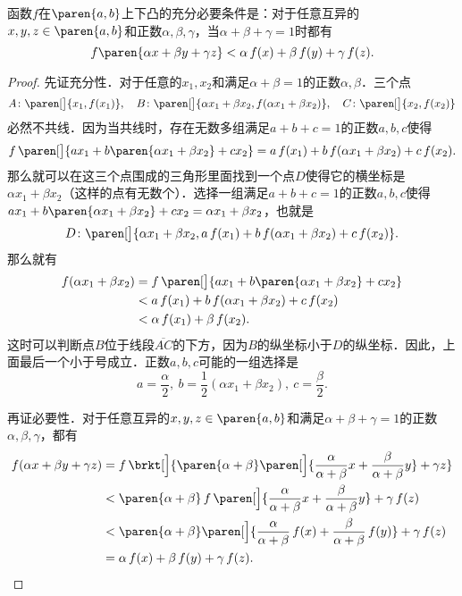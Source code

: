 \begin{example*}
  函数\(f\)在\(\paren{a,b}\)上下凸的充分必要条件是：对于任意互异的\(x, y, z \in \paren{a,b}\)和正数\(\alpha, \beta, \gamma\)，当\(\alpha+\beta+\gamma=1\)时都有
  \[
    f\paren{\alpha x + \beta y + \gamma z} < \alpha\,f(x) + \beta\,f(y) + \gamma\,f(z).
  \]

  \begin{proof}
    先证充分性．对于任意的\(x_1, x_2\)和满足\(\alpha+\beta=1\)的正数\(\alpha, \beta\)．三个点
    \[
      A\colon \paren[\big]{x_1, f(x_1)},\quad B\colon \paren[\big]{\alpha x_1 + \beta x_2, f(\alpha x_1 + \beta x_2)},\quad C\colon \paren[\big]{x_2, f(x_2)}
    \]
    必然不共线．因为当共线时，存在无数多组满足\(a+b+c=1\)的正数\(a, b, c\)使得
    \[
      f\,\paren[\big]{a x_1 + b\paren{\alpha x_1 + \beta x_2}  + c x_2} = a\,f(x_1) + b\,f(\alpha x_1 + \beta x_2) + c\,f(x_2).
    \]
    那么就可以在这三个点围成的三角形里面找到一个点\(D\)使得它的横坐标是\(\alpha x_1 + \beta x_2\)（这样的点有无数个）．选择一组满足\(a+b+c=1\)的正数\(a, b, c\)使得\(a x_1 + b\paren{\alpha x_1 + \beta x_2}  + c x_2 = \alpha x_1 + \beta x_2 \)，也就是
    \[
      D\colon \paren[\big]{\alpha x_1 + \beta x_2, a\,f(x_1) + b\,f(\alpha x_1 + \beta x_2) + c\,f(x_2)}.
    \]
    那么就有
    \[
      \begin{split}
        f(\alpha x_1 + \beta x_2)
        &= f\,\paren[\big]{a x_1 + b\paren{\alpha x_1 + \beta x_2}  + c x_2} \\
        &< a\,f(x_1) + b\,f(\alpha x_1 + \beta x_2) + c\,f(x_2) \\
        &< \alpha\,f(x_1) + \beta\,f(x_2).
      \end{split}
    \]
    这时可以判断点\(B\)位于线段\(\overline{AC}\)的下方，因为\(B\)的纵坐标小于\(D\)的纵坐标．因此，上面最后一个小于号成立．正数\(a, b, c\)可能的一组选择是
    \[
      a = \frac\alpha2,\ b = \frac12(\alpha x_1 + \beta x_2),\ c = \frac\beta2.
    \]

    再证必要性．对于任意互异的\(x, y, z \in \paren{a,b}\)和满足\(\alpha+\beta+\gamma=1\)的正数\(\alpha, \beta, \gamma\)，都有
    \[
      \begin{split}
        f(\alpha x + \beta y + \gamma z)
        &= f\,\brkt[\Big]{\paren{\alpha+\beta}\paren[\Big]{\frac{\alpha}{\alpha+\beta} x + \frac{\beta}{\alpha+\beta} y} + \gamma z} \\
        &< \paren{\alpha+\beta}\,f\,\paren[\Big]{\frac{\alpha}{\alpha+\beta} x + \frac{\beta}{\alpha+\beta} y} + \gamma\,f(z) \\
        &< \paren{\alpha+\beta}\paren[\Big]{\frac{\alpha}{\alpha+\beta}\,f(x) + \frac{\beta}{\alpha+\beta}\,f(y)} + \gamma\,f(z) \\
        &= \alpha\,f(x) + \beta\,f(y) + \gamma\,f(z). \qedhere
      \end{split}
    \]


\end{proof}
\end{example*}
